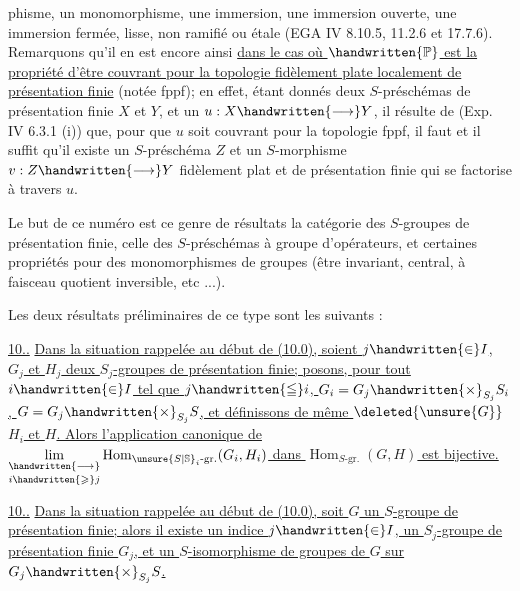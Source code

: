 %
%
phisme, un monomorphisme, une immersion, une immersion ouverte, une immersion fermée, lisse, non ramifié ou étale (EGA IV 8.10.5, 11.2.6 et 17.7.6). Remarquons qu'il en est encore ainsi  \uline{dans le cas où $\handwritten{\mathbb{P}}$ est la propriété d'être couvrant pour la topologie fidèlement plate localement de présentation finie} (notée fppf); en effet, étant donnés deux $S$-préschémas de présentation finie $X$ et $Y$, et un  $u:X\handwritten{\longrightarrow}Y$, il résulte de (Exp. IV 6.3.1 (i))\deleted{,} que, pour que $u$ soit couvrant pour la topologie fppf, il faut et il suffit qu'il existe un $S$-préschéma $Z$ et un $S$-morphisme $v:Z\handwritten{\longrightarrow}Y$ fidèlement plat et de présentation finie qui se factorise à travers $u$.

Le but de ce numéro est  ce genre de résultats  la catégorie des $S$-groupes de présentation finie,  celle des $S$-préschémas à groupe d'opérateurs, et  certaines propriétés pour des monomorphismes de groupes (être invariant, central, à faisceau quotient inversible, etc ...).

Les deux résultats préliminaires de ce type sont les suivants :

\uline{10..}  \uline{Dans la situation rappelée au début de (10.0), soient  $j\handwritten{\in}I$, $G_j$ et $H_j$ deux $S_j$-groupes de présentation finie; posons, pour tout $i\handwritten{\in}I$ tel que $j\handwritten{\leqq}i$, $G_i=G_j\handwritten{\times}_{S_j}S_i$, $G=G_j\handwritten{\times}_{S_j}S$, et définissons de même $\deleted{\unsure{G}}$ $H_i$ et $H$. Alors l'application canonique de $\underset{i\handwritten{\geqslant}j}{\underset{\handwritten{\longrightarrow}}{\lim}}\operatorname{Hom}_{\unsure{S|\mathbb{S}}_i\text{-gr.}}(G_i,H_i)$ dans $\operatorname{Hom}_{S\text{-gr.}}(G,H)$ est bijective.}

\uline{10..}  \uline{Dans la situation rappelée au début de (10.0), soit $G$ un $S$-groupe de présentation finie; alors il existe un indice $j\handwritten{\in}I$,  un $S_j$-groupe de présentation  finie $G_j$, et un  $S$-isomorphisme de groupes de $G$ sur $G_j\handwritten{\times}_{S_j}S$.}

